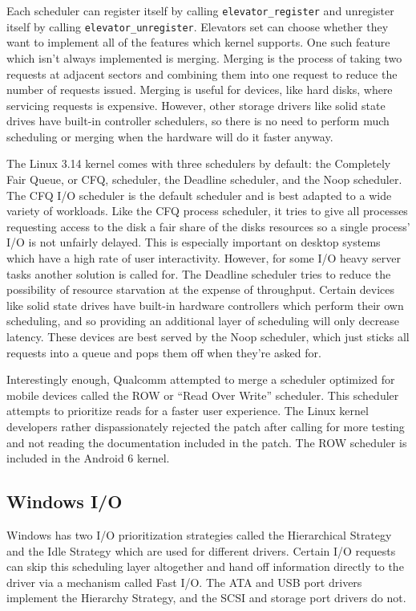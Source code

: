\documentclass[10pt,conference,draftclsnofoot,onecolumn]{IEEEtran}
\begin{document}
Each scheduler can register itself by calling \texttt{elevator\_register} and
unregister itself by calling \texttt{elevator\_unregister}. Elevators set can choose whether they want to implement all of the features which kernel supports. One such feature which isn't always implemented is merging. Merging is the process of taking two requests at adjacent sectors and combining them into one request to reduce the number of requests issued. Merging is useful for devices, like hard disks, where servicing requests is expensive. However, other storage drivers like solid state drives have built-in controller schedulers, so there is no need to perform much scheduling or merging when the hardware will do it faster anyway\cite{1_love_2010}.

The Linux 3.14 kernel comes with three schedulers by default: the Completely Fair Queue, or CFQ, scheduler, the Deadline scheduler, and the Noop scheduler. The CFQ I/O scheduler is the default scheduler and is best adapted to a wide variety of workloads. Like the CFQ process scheduler, it tries to give all processes requesting access to the disk a fair share of the disks resources so a single process' I/O is not unfairly delayed. This is especially important on desktop systems which have a high rate of user interactivity. However, for some I/O heavy server tasks another solution is called for. The Deadline scheduler tries to reduce the possibility of resource starvation at the expense of throughput. Certain devices like solid state drives have built-in hardware controllers which perform their own scheduling, and so providing an additional layer of scheduling will only decrease latency. These devices are best served by the Noop scheduler, which just sticks all requests into a queue and pops them off when they're asked for\cite{1_love_2010}.

Interestingly enough, Qualcomm attempted to merge a scheduler optimized for mobile devices called the ROW or ``Read Over Write'' scheduler. This scheduler attempts to prioritize reads for a faster user experience\cite{lkml-row-patch}. The Linux kernel developers rather dispassionately rejected the patch after calling for more testing and not reading the documentation included in the patch\cite{lkml-row-patch-rejection}. The ROW scheduler is included in the Android 6 kernel.

\subsection{Windows I/O}
Windows has two I/O prioritization strategies called the Hierarchical Strategy and the Idle Strategy which are used for different drivers. Certain I/O requests can skip this scheduling layer altogether and hand off information directly to the driver via a mechanism called Fast I/O. The ATA and USB port drivers implement the Hierarchy Strategy, and the SCSI and storage port drivers do not.
\end{document}

